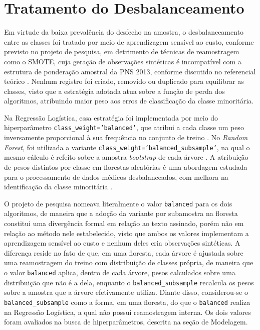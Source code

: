 \section{Tratamento do Desbalanceamento}\label{sec:desbalanceamento}

Em virtude da baixa prevalência do desfecho na amostra, o desbalanceamento entre as classes foi tratado por meio de aprendizagem sensível ao custo, conforme previsto no projeto de pesquisa, em detrimento de técnicas de reamostragem como o SMOTE, cuja geração de observações sintéticas é incompatível com a estrutura de ponderação amostral da PNS 2013, conforme discutido no referencial teórico \cite{araf2024costsensitive, 10.1371/journal.pone.0280387}. Nenhum registro foi criado, removido ou duplicado para equilibrar as classes, visto que a estratégia adotada atua sobre a função de perda dos algoritmos, atribuindo maior peso aos erros de classificação da classe minoritária.

Na Regressão Logística, essa estratégia foi implementada por meio do hiperparâmetro \texttt{class\_weight='balanced'}, que atribui a cada classe um peso inversamente proporcional à sua frequência no conjunto de treino \cite{pedregosa2011scikit}. No \textit{Random Forest}, foi utilizada a variante \texttt{class\_weight='balanced\_subsample'}, na qual o mesmo cálculo é refeito sobre a amostra \textit{bootstrap} de cada árvore \cite{sklearn2026randomforest}. A atribuição de pesos distintos por classe em florestas aleatórias é uma abordagem estudada para o processamento de dados médicos desbalanceados, com melhora na identificação da classe minoritária \cite{zhu2018classweights}.

O projeto de pesquisa nomeava literalmente o valor \texttt{balanced} para os dois algoritmos, de maneira que a adoção da variante por subamostra na floresta constitui uma divergência formal em relação ao texto assinado, porém não em relação ao método nele estabelecido, visto que ambos os valores implementam a aprendizagem sensível ao custo e nenhum deles cria observações sintéticas. A diferença reside no fato de que, em uma floresta, cada árvore é ajustada sobre uma reamostragem do treino com distribuição de classes própria, de maneira que o valor \texttt{balanced} aplica, dentro de cada árvore, pesos calculados sobre uma distribuição que não é a dela, enquanto o \texttt{balanced\_subsample} recalcula os pesos sobre a amostra que a árvore efetivamente utiliza. Diante disso, considerou-se o \texttt{balanced\_subsample} como a forma, em uma floresta, do que o \texttt{balanced} realiza na Regressão Logística, a qual não possui reamostragem interna. Os dois valores foram avaliados na busca de hiperparâmetros, descrita na seção de Modelagem.

